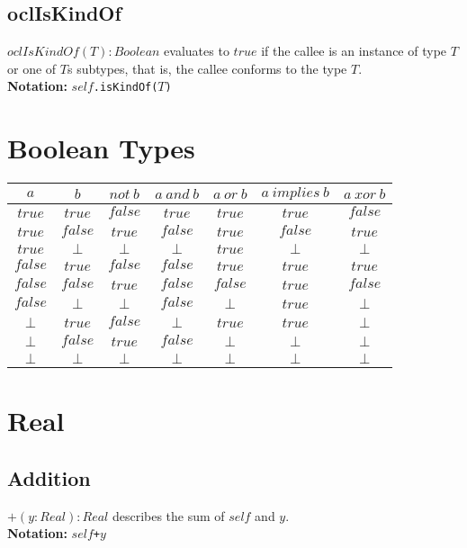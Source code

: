 \subsection{oclIsKindOf}
$\mathit{oclIsKindOf}(T):\mathit{Boolean}$ evaluates to $\mathit{true}$ if the
callee is
  an instance of type $T$ or one of $T$s subtypes, that is, the callee
  conforms to the type $T$.\\
  {\bf Notation:} $\mathit{self}$\verb+.isKindOf(+$T$\verb+)+
\section{Boolean Types}
\begin{tabular}{cc|ccccc}\hline
  $a$ & $b$ & $\mathit{not}\ b$ & $a\ \mathit{and}\ b$ & $a\
  \mathit{or}\ b$ & $a\ \mathit{implies}\ b$ & $a\ \mathit{xor}\ b$\\ \hline
  $\mathit{true}$ & $\mathit{true}$ & $\mathit{false}$ & $\mathit{true}$ & $\mathit{true}$ & $\mathit{true}$ & $\mathit{false}$ \\
  $\mathit{true}$ & $\mathit{false}$ & $\mathit{true}$ & $\mathit{false}$ & $\mathit{true}$ & $\mathit{false}$ & $\mathit{true}$ \\
  $\mathit{true}$ & $\bot$ & $\bot$ & $\bot$ & $\mathit{true}$ & $\bot$ & $\bot$ \\
  $\mathit{false}$ & $\mathit{true}$ & $\mathit{false}$ & $\mathit{false}$ & $\mathit{true}$ & $\mathit{true}$ & $\mathit{true}$ \\
  $\mathit{false}$ & $\mathit{false}$ & $\mathit{true}$ & $\mathit{false}$ & $\mathit{false}$ & $\mathit{true}$ & $\mathit{false}$ \\
  $\mathit{false}$ & $\bot$ & $\bot$ & $\mathit{false}$ & $\bot$ & $\mathit{true}$ & $\bot$ \\
  $\bot$ & $\mathit{true}$ & $\mathit{false}$ & $\bot$ & $\mathit{true}$ & $\mathit{true}$ & $\bot$ \\
  $\bot$ & $\mathit{false}$ & $\mathit{true}$ & $\mathit{false}$ & $\bot$ & $\bot$ & $\bot$ \\
  $\bot$ & $\bot$ & $\bot$ & $\bot$ & $\bot$ & $\bot$ & $\bot$ \\ \hline
\end{tabular}
\section{Real}
\subsection{Addition}
$+(y:\mathit{Real}):\mathit{Real}$ describes the sum of $\mathit{self}$ and $y$.\\
{\bf Notation:} $\mathit{self}$\verb-+-$y$
